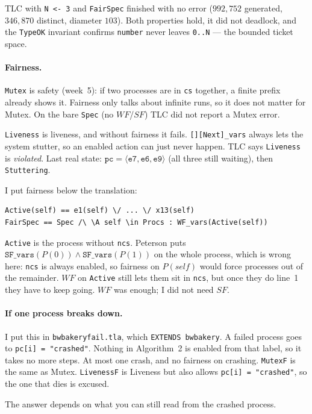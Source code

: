\documentclass{article}
\newcommand{\tuple}[1]{\langle #1\rangle}
\begin{document}
TLC with \texttt{N <- 3} and \texttt{FairSpec} finished with no error ($992{,}752$ generated, $346{,}870$ distinct, diameter $103$). Both properties hold, it did not deadlock, and the \texttt{TypeOK} invariant confirms \texttt{number} never leaves \texttt{0..N} --- the bounded ticket space.

\paragraph{Fairness.}
\texttt{Mutex} is safety (week~5): if two processes are in \texttt{cs} together, a finite prefix already shows it. Fairness only talks about infinite runs, so it does not matter for Mutex. On the bare \texttt{Spec} (no $WF$/$SF$) TLC did not report a Mutex error.

\texttt{Liveness} is liveness, and without fairness it fails. \texttt{[][Next]\_vars} always lets the system stutter, so an enabled action can just never happen. TLC says \texttt{Liveness} is \emph{violated}. Last real state: $\texttt{pc}=\tuple{\texttt{e7},\texttt{e6},\texttt{e9}}$ (all three still waiting), then \texttt{Stuttering}.

I put fairness below the translation:
\begin{verbatim}
Active(self) == e1(self) \/ ... \/ x13(self)
FairSpec == Spec /\ \A self \in Procs : WF_vars(Active(self))
\end{verbatim}
\texttt{Active} is the process without \texttt{ncs}. Peterson puts $\texttt{SF\_vars}(P(0))\wedge\texttt{SF\_vars}(P(1))$ on the whole process, which is wrong here: \texttt{ncs} is always enabled, so fairness on $P(\textit{self})$ would force processes out of the remainder. $WF$ on \texttt{Active} still lets them sit in \texttt{ncs}, but once they do line~1 they have to keep going. $WF$ was enough; I did not need $SF$.

\paragraph{If one process breaks down.}
I put this in \texttt{bwbakeryfail.tla}, which \texttt{EXTENDS bwbakery}. A failed process goes to \texttt{pc[i] = "crashed"}. Nothing in Algorithm~2 is enabled from that label, so it takes no more steps. At most one crash, and no fairness on crashing. \texttt{MutexF} is the same as Mutex. \texttt{LivenessF} is Liveness but also allows \texttt{pc[i] = "crashed"}, so the one that dies is excused.

The answer depends on what you can still read from the crashed process.
\end{document}
